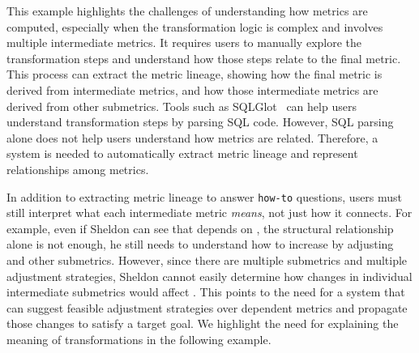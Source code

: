 This example highlights the challenges of understanding how metrics are
computed, especially when the transformation logic is complex and involves
multiple intermediate metrics. It requires users to manually explore the
transformation steps and understand how those steps relate to the final metric.
This process can extract the metric lineage, showing how the final metric is
derived from intermediate metrics, and how those intermediate metrics are
derived from other submetrics. Tools such as SQLGlot~\cite{sqlglot} can help
users understand transformation steps by parsing SQL code. However, SQL parsing
alone does not help users understand how metrics are related. Therefore, a
system is needed to automatically extract metric lineage and represent
relationships among metrics.

In addition to extracting metric lineage to answer \texttt{how-to} questions,
users must still interpret what each intermediate metric \textit{means}, not
just how it connects. For example, even if Sheldon can see that 
depends on , the structural relationship alone is
not enough, he still needs to understand how to increase  by
adjusting  and other submetrics. However, since
there are multiple submetrics and multiple adjustment strategies, Sheldon cannot
easily determine how changes in individual intermediate submetrics would affect
. This points to the need for a system that can suggest feasible
adjustment strategies over dependent metrics and propagate those changes to
satisfy a target goal. We highlight the need for explaining the meaning of
transformations in the following example.


